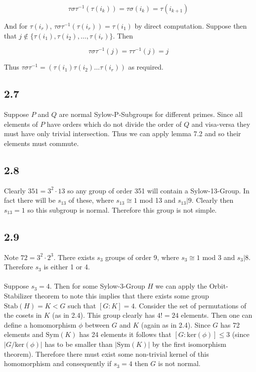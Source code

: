 \documentclass{article}
\begin{document}
\begin{equation*}
    \tau\sigma\tau^{-1}(\tau(i_k)) = \tau\sigma(i_k) = \tau(i_{k+1})
\end{equation*}

And for $\tau(i_r)$, $\tau\sigma\tau^{-1}(\tau(i_r)) = \tau(i_1)$ by direct computation. Suppose then 
that $j \notin \{\tau(i_1),\tau(i_2),\dots,\tau(i_r)\}$. Then 

\begin{equation*}
    \tau\sigma\tau^{-1}(j) = \tau\tau^{-1}(j) = j
\end{equation*}

Thus $\tau\sigma\tau^{-1} = (\tau(i_1)\tau(i_2)\dots\tau(i_r))$ as required.

\subsection*{2.7}
Suppose $P$ and $Q$ are normal Sylow-P-Subgroups for different primes. Since all elements of $P$ 
have orders which do not divide the order of $Q$ and visa-versa they must have only trivial intersection. 
Thus we can apply lemma 7.2 and so their elements must commute.

\subsection*{2.8}
Clearly $351 = 3^2\cdot 13$ so any group of order 351 will contain a Sylow-13-Group. In fact there 
will be $s_{13}$ of these, where $s_{13} \cong 1$ mod 13 and $s_{13} | 9$. Clearly then $s_{13} = 1$ so this 
subgroup is normal. Therefore this group is not simple.

\subsection*{2.9}
Note $72 = 3^2\cdot2^3$. There exists $s_3$ groups of 
order 9, where $s_3 \cong 1$ mod 3 and $s_3 | 8$. Therefore $s_3$ is either 1 or 4. 

\paragraph{}
Suppose $s_3 = 4$. Then for some Sylow-3-Group $H$ we can apply the Orbit-Stabilizer theorem to 
note this implies that there exists some group $\text{Stab}(H) = K < G$ such that $[G:K] = 4$. Consider the 
set of permutations of the cosets in $K$ (as in 2.4). This group clearly has $4! = 24$ elements. 
Then one can define a homomorphism $\phi$ between $G$ and $K$ (again as in 2.4). Since $G$ has 
72 elements and $\text{Sym}(K)$ has 24 elements it follows that $[G:\text{ker}(\phi)] \leq 3$ (since $|G/\text{ker}(\phi)|$ 
has to be smaller than $|\text{Sym}(K)|$ by the first isomorphism theorem). Therefore there must exist some 
non-trivial kernel of this homomorphism and consequently if $s_3 = 4$ then $G$ is not normal. 
\end{document}

